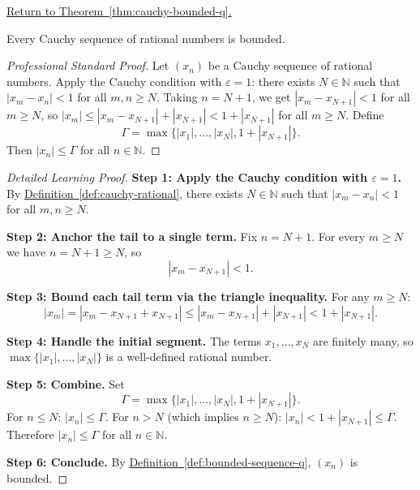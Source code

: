 
\newpage
{}
\label{prf:cauchy-bounded-q}

\begin{remark*}[Return]
\hyperref[thm:cauchy-bounded-q]{Return to Theorem~\ref*{thm:cauchy-bounded-q}.}
\end{remark*}

\begin{theorem*}
Every Cauchy sequence of rational numbers is bounded.
\end{theorem*}

\begin{proof}[Professional Standard Proof]
\LRAProofBodyStart
Let $(x_n)$ be a Cauchy sequence of rational numbers.
Apply the Cauchy condition with $\varepsilon = 1$: there exists
$N \in \mathbb{N}$ such that $|x_m - x_n| < 1$ for all $m, n \geq N$.
Taking $n = N + 1$, we get $|x_m - x_{N+1}| < 1$ for all $m \geq N$,
so $|x_m| \leq |x_m - x_{N+1}| + |x_{N+1}| < 1 + |x_{N+1}|$
for all $m \geq N$.
Define
\[
\Gamma = \max\{|x_1|, \ldots, |x_N|, 1 + |x_{N+1}|\}.
\]
Then $|x_n| \leq \Gamma$ for all $n \in \mathbb{N}$.
\end{proof}

\begin{proof}[Detailed Learning Proof]
\LRAProofBodyStart
\textbf{Step 1: Apply the Cauchy condition with $\varepsilon = 1$.}
By \hyperref[def:cauchy-rational]{Definition~\ref*{def:cauchy-rational}},
there exists $N \in \mathbb{N}$ such that
$|x_m - x_n| < 1$ for all $m, n \geq N$.

\textbf{Step 2: Anchor the tail to a single term.}
Fix $n = N + 1$.  For every $m \geq N$ we have $n = N + 1 \geq N$, so
\[
|x_m - x_{N+1}| < 1.
\]

\textbf{Step 3: Bound each tail term via the triangle inequality.}
For any $m \geq N$:
\[
|x_m| = |x_m - x_{N+1} + x_{N+1}|
\leq |x_m - x_{N+1}| + |x_{N+1}|
< 1 + |x_{N+1}|.
\]

\textbf{Step 4: Handle the initial segment.}
The terms $x_1, \ldots, x_N$ are finitely many, so
$\max\{|x_1|, \ldots, |x_N|\}$ is a well-defined rational number.

\textbf{Step 5: Combine.}
Set
\[
\Gamma = \max\{|x_1|, \ldots, |x_N|, 1 + |x_{N+1}|\}.
\]
For $n \leq N$: $|x_n| \leq \Gamma$.
For $n > N$ (which implies $n \geq N$): $|x_n| < 1 + |x_{N+1}| \leq \Gamma$.
Therefore $|x_n| \leq \Gamma$ for all $n \in \mathbb{N}$.

\textbf{Step 6: Conclude.}
By \hyperref[def:bounded-sequence-q]{Definition~\ref*{def:bounded-sequence-q}},
$(x_n)$ is bounded.
\end{proof}

